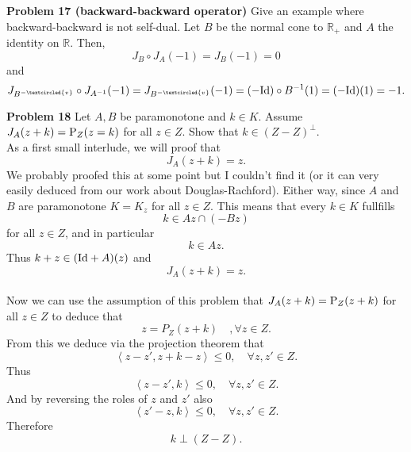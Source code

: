 \documentclass{scrartcl}
\newcommand{\R}{\mathbb{R}}
\theoremstyle{plain}
\theoremstyle{remark}
\newcommand{\Id}{\textup{Id}}
\renewcommand{\P}{\textup{P}}
\newcommand{\ov}{\textcircled{v}}
\begin{document}
\textbf{Problem 17 (backward-backward operator)} Give an example where backward-backward is not self-dual.
Let $B$ be the normal cone to $\R_{+}$ and $A$ the identity on $\R$.
Then, 
\begin{equation}
  J_{B} \circ J_{A} (-1) = J_{B} (-1) = 0
\end{equation}
and
\begin{equation}
  J_{B^{-\ov}} \circ J_{A^{-1}} (-1) = J_{B^{-\ov}} (-1) = (-\Id) \circ B^{-1} (1) = (-\Id) (1) = -1.
\end{equation}


\textbf{Problem 18} Let $A,B$ be paramonotone and $k \in K$. Assume $J_A(z+k) = \P_Z(z=k)$ for all $z \in Z$.
Show that $k \in (Z -Z)^{\perp}$.\\
As a first small interlude, we will proof that 
\begin{equation}
  J_A(z+k) = z.
\end{equation}
We probably proofed this at some point but I couldn't find it (or it can very easily deduced from our work about Douglas-Rachford).
Either way, since $A$ and $B$ are paramonotone $K=K_z$ for all $z \in Z$.
This means that every $k \in K$ fullfills 
\begin{equation}
  k \in Az \cap (-Bz)
\end{equation}
for all $z \in Z$, and in particular 
\begin{equation}
  k \in Az.
\end{equation}
Thus $k+z \in (\Id + A)(z)$ and 
\begin{equation}
  J_A(z+k) = z.
\end{equation}\\


Now we can use the assumption of this problem that $J_A(z+k) = \P_Z(z+k)$ for all $z \in Z$ to deduce that
\begin{equation}
  z = P_Z(z+k) \quad, \forall z \in Z.
\end{equation}
From this we deduce via the projection theorem that
\begin{equation}
  \left\langle z-z', z+k - z \right\rangle\le 0, \quad \forall z,z' \in Z.
\end{equation}
Thus
\begin{equation}
  \left\langle z-z', k \right\rangle\le 0, \quad \forall z,z' \in Z.
\end{equation}
And by reversing the roles of $z$ and $z'$ also
\begin{equation}
  \left\langle z'-z, k \right\rangle\le 0, \quad \forall z,z' \in Z.
\end{equation}
Therefore
\begin{equation}
  k \perp (Z-Z).
\end{equation}
\end{document}
